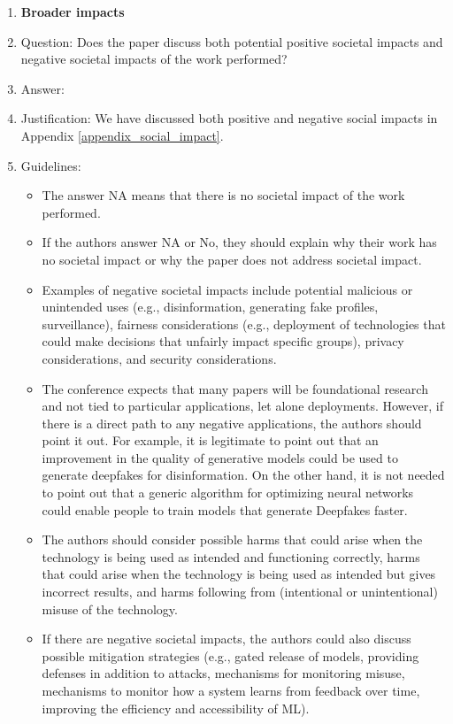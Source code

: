 \documentclass{article}
\begin{document}
\begin{enumerate}
\item {\bf Broader impacts}
    \item[] Question: Does the paper discuss both potential positive societal impacts and negative societal impacts of the work performed?
    \item[] Answer: \answerYes{} %
    \item[] Justification: We have discussed both positive and negative social impacts in Appendix \ref{appendix_social_impact}.
    \item[] Guidelines:
    \begin{itemize}
        \item The answer NA means that there is no societal impact of the work performed.
        \item If the authors answer NA or No, they should explain why their work has no societal impact or why the paper does not address societal impact.
        \item Examples of negative societal impacts include potential malicious or unintended uses (e.g., disinformation, generating fake profiles, surveillance), fairness considerations (e.g., deployment of technologies that could make decisions that unfairly impact specific groups), privacy considerations, and security considerations.
        \item The conference expects that many papers will be foundational research and not tied to particular applications, let alone deployments. However, if there is a direct path to any negative applications, the authors should point it out. For example, it is legitimate to point out that an improvement in the quality of generative models could be used to generate deepfakes for disinformation. On the other hand, it is not needed to point out that a generic algorithm for optimizing neural networks could enable people to train models that generate Deepfakes faster.
        \item The authors should consider possible harms that could arise when the technology is being used as intended and functioning correctly, harms that could arise when the technology is being used as intended but gives incorrect results, and harms following from (intentional or unintentional) misuse of the technology.
        \item If there are negative societal impacts, the authors could also discuss possible mitigation strategies (e.g., gated release of models, providing defenses in addition to attacks, mechanisms for monitoring misuse, mechanisms to monitor how a system learns from feedback over time, improving the efficiency and accessibility of ML).
    \end{itemize}
    

\end{enumerate}
\end{document}
